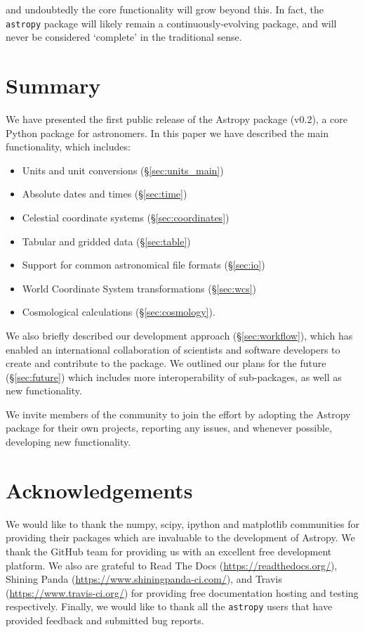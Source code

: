 \documentclass[traditabstract]{aa}
\newcommand{\astropy}{\texttt{astropy}\xspace}
\begin{document}
\noindent and undoubtedly the core functionality will grow beyond this. In
fact, the \astropy package will likely remain a continuously-evolving package,
and will never be considered `complete' in the traditional sense.

\section{Summary}

\label{sec:summary}


We have presented the first public release of the Astropy package (v0.2), a
core Python package for astronomers. In this paper we have described the main
functionality, which includes:

\begin{itemize}
\item Units and unit conversions (\S\ref{sec:units_main})
\item Absolute dates and times (\S\ref{sec:time})
\item Celestial coordinate systems (\S\ref{sec:coordinates})
\item Tabular and gridded data (\S\ref{sec:table})
\item Support for common astronomical file formats (\S\ref{sec:io})
\item World Coordinate System transformations (\S\ref{sec:wcs})
\item Cosmological calculations (\S\ref{sec:cosmology}).
\end{itemize}

We also briefly described our development approach (\S\ref{sec:workflow}),
which has enabled an international collaboration of scientists and software
developers to create and contribute to the package. We outlined our plans for
the future (\S\ref{sec:future}) which includes more interoperability of
sub-packages, as well as new functionality.

We invite members of the community to join the effort by adopting the Astropy package for
their own projects, reporting any issues, and whenever possible, developing new
functionality.


\section{Acknowledgements}

\label{sec:acknowledgements}

We would like to thank the \gls{numpy}, \gls{scipy}, \gls{ipython} and
\gls{matplotlib} communities for providing their packages which are invaluable
to the development of Astropy. We thank the GitHub team for providing us with
an excellent free development platform. We also are grateful to Read The Docs
(\url{https://readthedocs.org/}), Shining Panda
(\url{https://www.shiningpanda-ci.com/}), and Travis
(\url{https://www.travis-ci.org/}) for providing free documentation
hosting and testing respectively. Finally, we would like to thank all the
\astropy users that have provided feedback and submitted bug reports.



\end{document}
